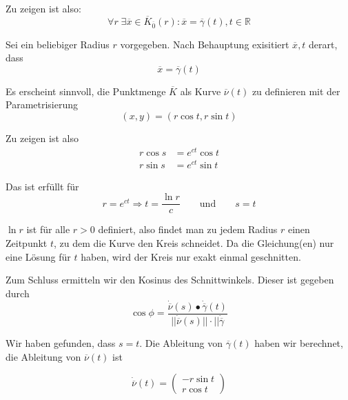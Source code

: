 \documentclass[a4paper,german,12pt,smallheadings]{scrartcl}
\begin{document}
\begin{enumerate}[(1)]
    Zu zeigen ist also:
    \begin{equation*}
      \forall r \; \exists \overline{x} \in \overline{K}_{\overline{0}}(r): \overline{x} = \overline{\gamma}(t), t \in \mathbb{R}
    \end{equation*}

    Sei ein beliebiger Radius $r$ vorgegeben. Nach Behauptung exisitiert $\overline{x}, t$ derart, dass
    \begin{equation*}
      \overline{x} = \overline{\gamma}(t)
    \end{equation*}

    Es erscheint sinnvoll, die Punktmenge $\overline{K}$ als Kurve $\overline{\nu}(t)$ zu definieren mit der Parametrisierung
    \begin{equation}
      (x,y) = (r \cos t, r \sin t)
    \end{equation}

    Zu zeigen ist also
    \begin{align*}
      r \cos s &= e^{ct} \cos t \\
      r \sin s &= e^{ct} \sin t
    \end{align*}

    Das ist erfüllt für
    \begin{equation*}
      r = e^{ct} \Rightarrow t = \frac{\ln r}{c} \qquad \text{und} \qquad s=t
    \end{equation*}

    $\ln r$ ist für alle $r > 0$ definiert, also findet man zu jedem Radius $r$
    einen Zeitpunkt $t$, zu dem die Kurve den Kreis schneidet. Da die
    Gleichung(en) nur eine Lösung für $t$ haben, wird der Kreis nur exakt
    einmal geschnitten.

    Zum Schluss ermitteln wir den Kosinus des Schnittwinkels. Dieser ist gegeben durch
    \begin{equation*}
      \cos \phi = \frac{\dot{\overline{\nu}}(s) \bullet \dot{\overline{\gamma}}(t)}{||\dot{\overline{\nu}}(s)|| \cdot ||\dot{\overline{\gamma}}}
    \end{equation*}

    Wir haben gefunden, dass $s=t$. Die Ableitung von $\overline{\gamma}(t)$
    haben wir berechnet, die Ableitung von $\overline{\nu}(t)$ ist

    \begin{equation*}
      \dot{\overline{\nu}}(t) = \begin{pmatrix}
        -r \sin t \\
        r \cos t 
      \end{pmatrix}
    \end{equation*}


\end{enumerate}
\end{document}
